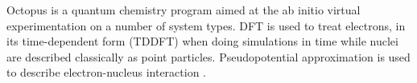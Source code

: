 Octopus is a quantum chemistry program aimed at the ab initio virtual experimentation on a number of system types. DFT is used to treat electrons, in its time-dependent form (TDDFT) when doing simulations in time while nuclei are described classically as point particles. Pseudopotential approximation is used to describe electron-nucleus interaction \cite{Castro_2006}.